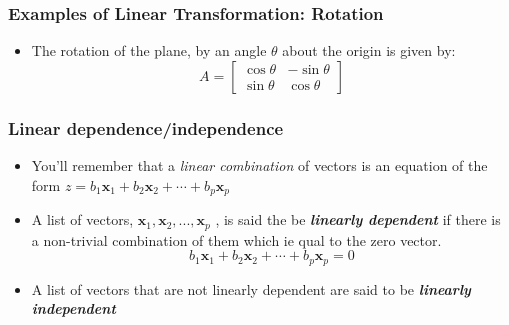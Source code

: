 \documentclass{beamer}
\newcommand{\Mtx}[1]{\ensuremath{\mathbf{#1}}}
\begin{document}
\begin{frame}
  \frametitle{Examples of Linear Transformation: Rotation}


\begin{itemize}
\item The rotation of the plane, by an angle $\theta$ about the origin is given by:
\[
A = \left[
\begin{array}{cc}
\cos \theta & -\sin \theta\\ 
\sin \theta & \cos \theta 
\end{array}
\right]
\]
\end{itemize}

\begin{center}


\end{center}


\end{frame}

\begin{frame}
  \frametitle{Linear dependence/independence}

\begin{itemize}
\item You'll remember that a \emph{linear combination} of vectors is an equation of the form $z = b_1 \Mtx{x}_1 + b_2 \Mtx{x}_2 + \cdots + b_p \Mtx{x}_p$

\item A list of vectors, $\Mtx{x}_1, \Mtx{x}_2, ..., \Mtx{x}_p$ , is said the be \emph{\textbf{linearly dependent}} if there is a non-trivial combination of them which ie qual to the zero vector.
\[
 b_1 \Mtx{x}_1 + b_2 \Mtx{x}_2 + \cdots + b_p \Mtx{x}_p = 0
\]

\item A list of vectors that are not linearly dependent are said to be \emph{\textbf{linearly independent}} 

\end{itemize}

\end{frame}
\end{document}
